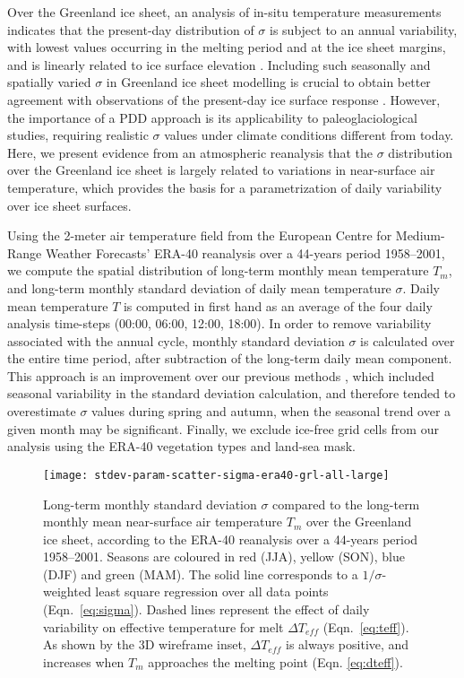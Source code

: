 \documentclass[review]{igs}
\begin{document}
Over the Greenland ice sheet, an analysis of in-situ temperature measurements indicates that the present-day distribution of $\sigma$ is subject to an annual variability, with lowest values occurring in the melting period and at the ice sheet margins, and is linearly related to ice surface elevation \citep{fausto-etal-2009,fausto-etal-2011}. Including such seasonally and spatially varied $\sigma$ in Greenland ice sheet modelling is crucial to obtain better agreement with observations of the present-day ice surface response \citep{rogozhina-rau-2014}. However, the importance of a PDD approach is its applicability to paleoglaciological studies, requiring realistic $\sigma$ values under climate conditions different from today. Here, we present evidence from an atmospheric reanalysis that the $\sigma$ distribution over the Greenland ice sheet is largely related to variations in near-surface air temperature, which provides the basis for a parametrization of daily variability over ice sheet surfaces.

Using the 2-meter air temperature field from the European Centre for Medium-Range Weather Forecasts’ ERA-40 reanalysis \citep{uppala-etal-2005} over a 44-years period 1958--2001, we compute the spatial distribution of long-term monthly mean temperature $T_{m}$, and long-term monthly standard deviation of daily mean temperature $\sigma$. Daily mean temperature $T$ is computed in first hand as an average of the four daily analysis time-steps (00:00, 06:00, 12:00, 18:00). In order to remove variability associated with the annual cycle, monthly standard deviation $\sigma$ is calculated over the entire time period, after subtraction of the long-term daily mean component. This approach is an improvement over our previous methods \citep{seguinot-2013,rogozhina-rau-2014}, which included seasonal variability in the standard deviation calculation, and therefore tended to overestimate $\sigma$ values during spring and autumn, when the seasonal trend over a given month may be significant. Finally, we exclude ice-free grid cells from our analysis using the ERA-40 vegetation types and land-sea mask. 

\begin{figure*}
    \centering\texttt{[image: stdev-param-scatter-sigma-era40-grl-all-large]}
    \caption{Long-term monthly standard deviation $\sigma$ compared to the long-term monthly mean near-surface air temperature $T_{m}$ over the Greenland ice sheet, according to the ERA-40 reanalysis \citep{uppala-etal-2005} over a 44-years period 1958–2001. Seasons are coloured in red (JJA), yellow (SON), blue (DJF) and green (MAM). The solid line corresponds to a $1/\sigma$-weighted least square regression over all data points (Eqn.~\ref{eq:sigma}). Dashed lines represent the effect of daily variability on effective temperature for melt $\Delta T_{eff}$ (Eqn.~\ref{eq:teff}). As shown by the 3D wireframe inset, $\Delta T_{eff}$ is always positive, and increases when $T_{m}$ approaches the melting point (Eqn. \ref{eq:dteff}).}
    \label{fig:grl}
\end{figure*}
\end{document}
